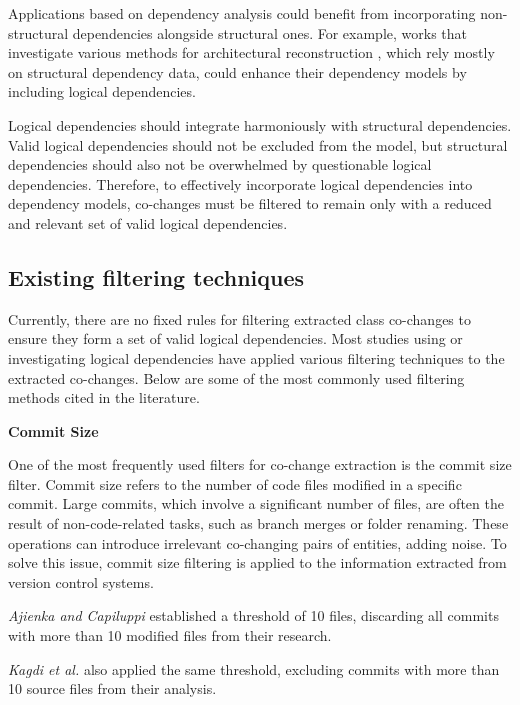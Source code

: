 Applications based on dependency analysis could benefit from incorporating non-structural dependencies alongside structural ones. For example, works that investigate various methods for architectural reconstruction \cite{SoraConti, SoraSem13, PagerankENASE}, which rely mostly on structural dependency data, could enhance their dependency models by including logical dependencies.

Logical dependencies should integrate harmoniously with structural dependencies. Valid logical dependencies should not be excluded from the model, but structural dependencies should also not be overwhelmed by questionable logical dependencies. Therefore, to effectively incorporate logical dependencies into dependency models, co-changes must be filtered to remain only with a reduced and relevant set of valid logical dependencies.




\subsection{Existing filtering techniques}

\hspace{4em}Currently, there are no fixed rules for filtering extracted class co-changes to ensure they form a set of valid logical dependencies. Most studies using or investigating logical dependencies have applied various filtering techniques to the extracted co-changes. Below are some of the most commonly used filtering methods cited in the literature.


\textbf{Commit Size}  

One of the most frequently used filters for co-change extraction is the commit size filter. Commit size refers to the number of code files modified in a specific commit. Large commits, which involve a significant number of files, are often the result of non-code-related tasks, such as branch merges or folder renaming. These operations can introduce irrelevant co-changing pairs of entities, adding noise. To solve this issue, commit size filtering is applied to the information extracted from version control systems.

\textit{Ajienka and Capiluppi} \cite{DBLP:journals/jss/AjienkaC17} established a threshold of 10 files, discarding all commits with more than 10 modified files from their research.

\textit{Kagdi et al.} also applied the same threshold, excluding commits with more than 10 source files from their analysis.

